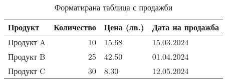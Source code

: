 \begin{table}
\caption{Форматирана таблица с продажби}
\label{tab:formatted_sales}
\begin{tabular}{lrll}
\toprule
Продукт & Количество & Цена (лв.) & Дата на продажба \\
\midrule
Продукт A & 10 & 15.68 & 15.03.2024 \\
Продукт B & 25 & 42.50 & 01.04.2024 \\
Продукт C & 30 & 8.30 & 12.05.2024 \\
\bottomrule
\end{tabular}
\end{table}
